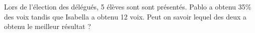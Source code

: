 
Lors de l'élection des délégués, 5 élèves sont sont présentés. Pablo a obtenu 35\% des voix tandis que Isabella a obtenu 12 voix. Peut on savoir lequel des deux a obtenu le meilleur résultat ?
